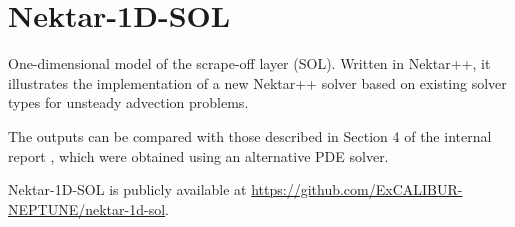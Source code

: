 \section{Nektar-1D-SOL}
One-dimensional model of the scrape-off layer (SOL).  Written in Nektar++, it illustrates the implementation of a new
 Nektar++ solver based on existing solver types for unsteady advection problems.

The outputs can be compared with those described in Section 4 of the internal report \cite{y3re222}, which were 
obtained using an alternative PDE solver.

Nektar-1D-SOL is publicly available at \url{https://github.com/ExCALIBUR-NEPTUNE/nektar-1d-sol}.
